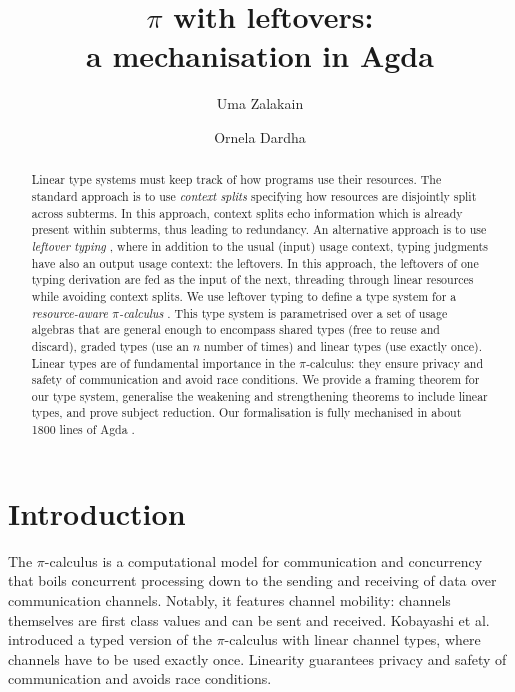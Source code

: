 \documentclass[runningheads]{llncs}
\title{$\pi$ with leftovers: \\ a mechanisation in Agda}
\author{
  Uma Zalakain\inst{1}\orcidID{0000-0002-3268-9338}
  \and
  Ornela Dardha\inst{2}\orcidID{0000-0001-9927-7875}
}
\institute{
  University of Glasgow, Scotland \ \ \email{u.zalakain.1@research.gla.ac.uk}
  \and
  University of Glasgow, Scotland \ \ \email{ornela.dardha@glasgow.ac.uk}
}
\newcommand{\picalc}{$\pi$-calculus}
\begin{document}
\maketitle

\begin{abstract}
  Linear type systems must keep track of how programs use their resources.
  The standard approach is to use \emph{context splits} specifying how resources are disjointly split across subterms.
  In this approach, context splits echo information which is already present within subterms, thus leading to redundancy.  An alternative approach is to use \emph{leftover typing} \cite{Mackie,Allais2018a}, where in addition to the usual (input) usage context, typing judgments have also an output usage context: the leftovers.
  In this approach, the leftovers of one typing derivation are fed as the input of the next, threading through linear resources while avoiding context splits.
  We use leftover typing to define a type system for a \emph{resource-aware \picalc{}} \cite{MilnerPW92,Milner99}.
  This type system is parametrised over a set of usage algebras that are general enough to encompass shared types (free to reuse and discard), graded types (use an $n$ number of times) and linear types (use exactly once).
   Linear types are of fundamental importance in the \picalc{}: they ensure privacy and safety of communication and avoid race conditions.
  We provide a framing theorem for our type system, generalise the weakening and strengthening theorems to include linear types, and prove subject reduction.
  Our formalisation is fully mechanised in about 1800 lines of Agda \cite{Zalakain2020Agda}.

\end{abstract}

\section{Introduction}

The \picalc{} \cite{MilnerPW92,Milner99} is a computational model for communication and concurrency that boils concurrent processing down to the sending and receiving of data over communication channels.
Notably, it features channel mobility: channels themselves are first class values and can be sent and received.
Kobayashi et al. \cite{KPT96} introduced a typed version of the \picalc{} with linear channel types, where channels have to be used exactly once.
Linearity guarantees privacy and safety of communication and avoids race conditions.
\end{document}

